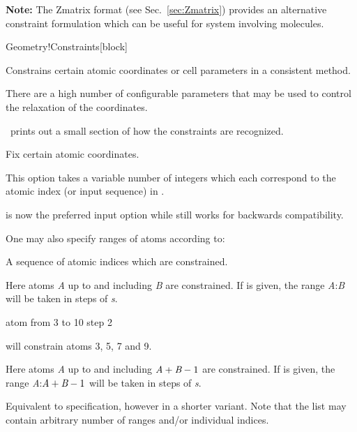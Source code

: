 \textbf{Note:} The Zmatrix format (see Sec.~\ref{sec:Zmatrix}) provides
an alternative constraint formulation which can be useful for system
involving molecules.

\begin{fdfentry}{Geometry!Constraints}[block]

  Constrains certain atomic coordinates or cell parameters in a
  consistent method.

  There are a high number of configurable parameters that may be used
  to control the relaxation of the coordinates.

  \note \siesta\ prints out a small section of how the constraints are
  recognized. 

  \begin{fdfoptions}
    Fix certain atomic coordinates. 

    This option takes a variable number of integers which each
    correspond to the atomic index (or input sequence) in
    .

     is now the preferred input option while
     still works for backwards compatibility.

    One may also specify ranges of atoms according to:

    \begin{fdfoptions}
      A sequence of atomic indices which are constrained. 

      Here atoms \emph{A} up to and including \emph{B} are
      constrained.
      If  is given, the range
      \emph{A}:\emph{B} will be taken in steps of \emph{s}.

      \begin{fdfexample}
        atom from 3 to 10 step 2
      \end{fdfexample}
      will constrain atoms 3, 5, 7 and 9.

      Here atoms \emph{A} up to and including $\emph{A}+\emph{B}-1$
      are constrained.  
      If  is given, the range
      \emph{A}:$\emph{A}+\emph{B}-1$ will be taken in steps of
      \emph{s}.

      Equivalent to  specification, however in a
      shorter variant. Note that the list may contain arbitrary number
      of ranges and/or individual indices.


\end{fdfoptions}
\end{fdfoptions}
\end{fdfentry}
